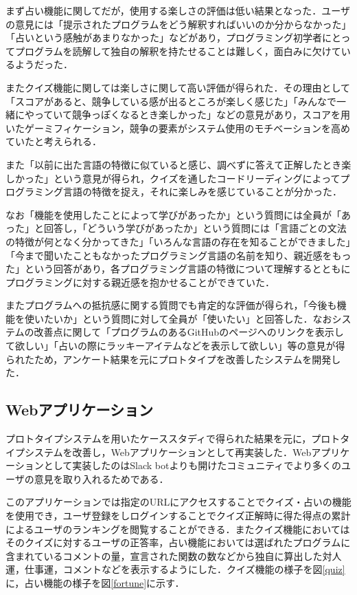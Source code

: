 まず占い機能に関してだが，使用する楽しさの評価は低い結果となった．ユーザの意見には「提示されたプログラムをどう解釈すればいいのか分からなかった」「占いという感触があまりなかった」などがあり，プログラミング初学者にとってプログラムを読解して独自の解釈を持たせることは難しく，面白みに欠けているようだった．

またクイズ機能に関しては楽しさに関して高い評価が得られた．その理由として「スコアがあると、競争している感が出るところが楽しく感じた」「みんなで一緒にやっていて競争っぽくなるとき楽しかった」などの意見があり，スコアを用いたゲーミフィケーション，競争の要素がシステム使用のモチベーションを高めていたと考えられる．

また「以前に出た言語の特徴に似ていると感じ、調べずに答えて正解したとき楽しかった」という意見が得られ，クイズを通したコードリーディングによってプログラミング言語の特徴を捉え，それに楽しみを感じていることが分かった．

なお「機能を使用したことによって学びがあったか」という質問には全員が「あった」と回答し，「どういう学びがあったか」という質問には「言語ごとの文法の特徴が何となく分かってきた」「いろんな言語の存在を知ることができました」「今まで聞いたこともなかったプログラミング言語の名前を知り、親近感をもった」という回答があり，各プログラミング言語の特徴について理解するとともにプログラミングに対する親近感を抱かせることができていた．

またプログラムへの抵抗感に関する質問でも肯定的な評価が得られ，「今後も機能を使いたいか」という質問に対して全員が「使いたい」と回答した．なおシステムの改善点に関して「プログラムのあるGitHubのページへのリンクを表示して欲しい」「占いの際にラッキーアイテムなどを表示して欲しい」等の意見が得られたため，アンケート結果を元にプロトタイプを改善したシステムを開発した．

\subsection{Webアプリケーション}
プロトタイプシステムを用いたケーススタディで得られた結果を元に，プロトタイプシステムを改善し，Webアプリケーションとして再実装した．Webアプリケーションとして実装したのはSlack botよりも開けたコミュニティでより多くのユーザの意見を取り入れるためである．

このアプリケーションでは指定のURLにアクセスすることでクイズ・占いの機能を使用でき，ユーザ登録をしログインすることでクイズ正解時に得た得点の累計によるユーザのランキングを閲覧することができる．またクイズ機能においてはそのクイズに対するユーザの正答率，占い機能においては選ばれたプログラムに含まれているコメントの量，宣言された関数の数などから独自に算出した対人運，仕事運，コメントなどを表示するようにした．クイズ機能の様子を図\ref{quiz}に，占い機能の様子を図\ref{fortune}に示す．

